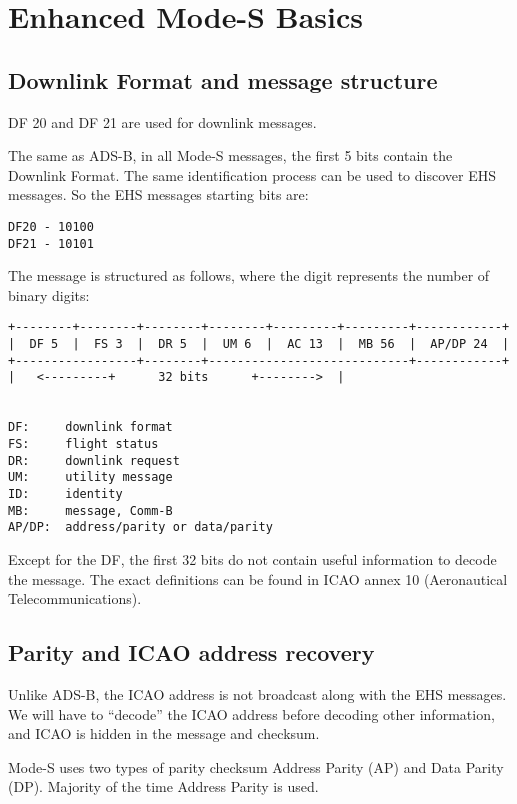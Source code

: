 \section{Enhanced Mode-S Basics}\label{introduction}

\subsection{Downlink Format and message
structure}\label{downlink-format-and-message-structure}

DF 20 and DF 21 are used for downlink messages.

The same as ADS-B, in all Mode-S messages, the first 5 bits contain the
Downlink Format. The same identification process can be used to discover
EHS messages. So the EHS messages starting bits are:

\begin{verbatim}
DF20 - 10100
DF21 - 10101
\end{verbatim}

The message is structured as follows, where the digit represents the
number of binary digits:

\begin{verbatim}
+--------+--------+--------+--------+---------+---------+------------+
|  DF 5  |  FS 3  |  DR 5  |  UM 6  |  AC 13  |  MB 56  |  AP/DP 24  |
+-----------------+--------+----------------------------+------------+
|   <---------+      32 bits      +-------->  |


DF:     downlink format
FS:     flight status
DR:     downlink request
UM:     utility message
ID:     identity
MB:     message, Comm-B
AP/DP:  address/parity or data/parity
\end{verbatim}

Except for the DF, the first 32 bits do not contain useful information
to decode the message. The exact definitions can be found in ICAO annex
10 (Aeronautical Telecommunications).

\subsection{Parity and ICAO address
recovery}\label{parity-and-icao-address-recovery}

Unlike ADS-B, the ICAO address is not broadcast along with the EHS
messages. We will have to ``decode'' the ICAO address before decoding
other information, and ICAO is hidden in the message and checksum.

Mode-S uses two types of parity checksum Address Parity (AP) and Data
Parity (DP). Majority of the time Address Parity is used.

